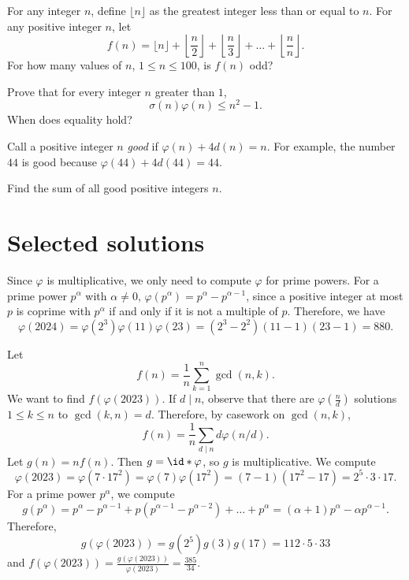 \documentclass[11pt]{scrartcl}
\begin{document}
\begin{problem} %
    For any integer $n$, define $\lfloor n \rfloor$ as the greatest integer less than or equal to $n$. For any positive integer $n$, let
    \[
        f(n) = \lfloor n \rfloor + \left\lfloor \frac{n}{2} \right\rfloor + \left\lfloor \frac{n}{3} \right\rfloor + \dots + \left\lfloor \frac{n}{n} \right\rfloor.
    \]
    For how many values of $n$, $1 \le n \le 100$, is $f(n)$ odd?
\end{problem}

\begin{problem} %
    Prove that for every integer $n$ greater than $1$,
    \[
        \sigma(n)\varphi(n) \le n^2 - 1.
    \]
    When does equality hold?
\end{problem}

\begin{problem} %
    Call a positive integer $n$ \emph{good} if $\varphi(n) + 4d(n) = n$. For example, the number $44$ is good because $\varphi(44) + 4d(44) = 44$.

    Find the sum of all good positive integers $n$.
\end{problem}

\pagebreak

\section{Selected solutions}

\begin{solution}{}
    Since $\varphi$ is multiplicative, we only need to compute $\varphi$ for prime powers. For a prime power $p^\alpha$ with $\alpha \neq 0$, $\varphi(p^\alpha) = p^\alpha - p^{\alpha - 1}$, since a positive integer at most $p$ is coprime with $p^\alpha$ if and only if it is not a multiple of $p$. Therefore, we have
    \[\varphi(2024) = \varphi\left(2^3\right)\varphi(11)\varphi(23) = \left(2^3 - 2^2\right)(11 - 1)(23 - 1) = 880.\]
\end{solution}

\begin{solution}{}
	Let
	\[f(n) = \frac 1n\sum_{k = 1}^{n}\gcd(n,k).\]
	We want to find $f(\varphi(2023))$. If $d \mid n$, observe that there are $\varphi(\frac nd)$ solutions $1 \le k \le n$ to $\gcd(k,n) = d$. Therefore, by casework on $\gcd(n,k)$,
	\[f(n) = \frac 1n\sum_{d \mid n}d\varphi(n/d).\]
	Let $g(n) = nf(n)$. Then $g = \id \ast \varphi$, so $g$ is multiplicative. We compute
	\[\varphi(2023) = \varphi(7 \cdot 17^2) = \varphi(7)\varphi(17^2) = (7 - 1)(17^2 - 17) = 2^5 \cdot 3 \cdot 17.\]
	For a prime power $p^\alpha$, we compute
	\[g(p^\alpha) = p^\alpha - p^{\alpha - 1} + p(p^{\alpha - 1} - p^{\alpha - 2}) + \dots + p^{\alpha} = (\alpha + 1)p^\alpha - \alpha p^{\alpha - 1}.\]
	Therefore,
	\[g(\varphi(2023)) = g(2^5)g(3)g(17) = 112 \cdot 5 \cdot 33\]
	and $f(\varphi(2023)) = \frac{g(\varphi(2023))}{\varphi(2023)} = \frac{385}{34}$.
\end{solution}
\end{document}
